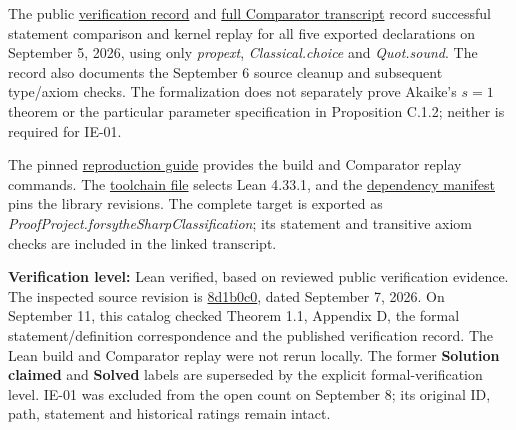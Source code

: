 \documentclass[11pt,a4paper]{article}
\begin{document}
The public
\href{https://github.com/sgstepaniants/Forsythe/blob/8d1b0c0545a77b40245e84705aa7d273e6c81e62/lean-proof/VERIFICATION.md}{verification
record} and
\href{https://github.com/sgstepaniants/Forsythe/blob/8d1b0c0545a77b40245e84705aa7d273e6c81e62/lean-proof/verification-logs/linux-comparator-final.log}{full
Comparator transcript} record successful statement comparison and kernel
replay for all five exported declarations on September 5, 2026, using
only \textit{propext}, \textit{Classical.choice} and
\textit{Quot.sound}. The record also documents the September 6 source
cleanup and subsequent type/axiom checks. The formalization does not
separately prove Akaike's \(s=1\) theorem or the particular parameter
specification in Proposition C.1.2; neither is required for IE-01.

The pinned
\href{https://github.com/sgstepaniants/Forsythe/blob/8d1b0c0545a77b40245e84705aa7d273e6c81e62/lean-proof/reproduction/README.md}{reproduction
guide} provides the build and Comparator replay commands. The
\href{https://github.com/sgstepaniants/Forsythe/blob/8d1b0c0545a77b40245e84705aa7d273e6c81e62/lean-proof/lean-toolchain}{toolchain
file} selects Lean 4.33.1, and the
\href{https://github.com/sgstepaniants/Forsythe/blob/8d1b0c0545a77b40245e84705aa7d273e6c81e62/lean-proof/lake-manifest.json}{dependency
manifest} pins the library revisions. The complete target is exported as
\textit{ProofProject.forsytheSharpClassification}; its statement and
transitive axiom checks are included in the linked transcript.

\textbf{Verification level:} Lean verified, based on reviewed public
verification evidence. The inspected source revision is
\href{https://github.com/sgstepaniants/Forsythe/tree/8d1b0c0545a77b40245e84705aa7d273e6c81e62}{8d1b0c0},
dated September 7, 2026. On September 11, this catalog checked Theorem
1.1, Appendix D, the formal statement/definition correspondence and the
published verification record. The Lean build and Comparator replay were
not rerun locally. The former \textbf{Solution claimed} and
\textbf{Solved} labels are superseded by the explicit
formal-verification level. IE-01 was excluded from the open count on
September 8; its original ID, path, statement and historical ratings
remain intact.
\end{document}
